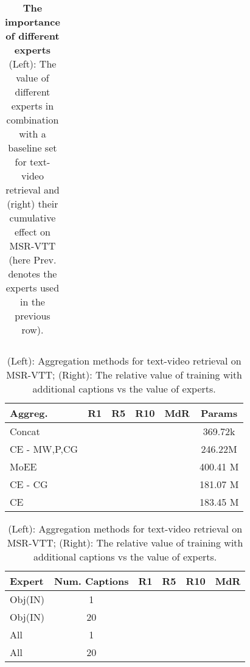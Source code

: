 \documentclass{bmvc2k}
\begin{document}
\begin{table}[h!]
\begin{minipage}{0.45\linewidth}
\begin{tabular}{l c c c c c}
\end{tabular}
\end{minipage}
\vspace{0.2cm}
\caption{\textbf{The importance of different experts} (Left): The value of different experts in combination with a baseline set for text-video retrieval and (right) their cumulative effect on MSR-VTT (here Prev. denotes the experts used in the previous row).}
\label{table:Ablation_single} 
\end{table}



\begin{table}[ht]
\hspace{-0.25cm}
\begin{minipage}{0.45\linewidth}
\centering 
\scriptsize 
\setlength{\tabcolsep}{2pt}
\begin{tabular}{l c c c c c } 
\hline\hline
Aggreg. &  R1 \hspace{0.5em} & R5 \hspace{0.5em} & R10\hspace{0.5em} & MdR\hspace{0.5em} & Params\hspace{0.5em}  \\ 
\hline 
Concat &	&	&	&	& 369.72k \\
CE - MW,P,CG &	&	&	& & 246.22M \\
MoEE~\cite{miech2018learning} &	&	&	& & 400.41 M \\
CE - CG &	&	&	& & 181.07 M \\
CE &	&	&	& & 183.45 M \\
\hline\hline
\end{tabular}
\end{minipage}
\hspace{0.6cm}
\begin{minipage}{0.45\linewidth}

\centering 
\scriptsize 
\setlength{\tabcolsep}{2pt}
\begin{tabular}{l c| c  c c c}
\hline \hline
Expert & Num. Captions & R1 & R5 & R10 & MdR   \\ 
\hline 
Obj(IN) & 1 &	&	&	&	\\
Obj(IN) & 20 &	&	&	&	\\
All & 1 &	&	&	& \\
All & 20 &	&	&	& \\
\hline \hline

\end{tabular}
\end{minipage}
\vspace{0.1cm}
\caption{(Left): Aggregation methods for text-video retrieval on MSR-VTT; (Right): The relative value of training with additional captions vs the value of experts.}
\label{table:agg-captions} 
\vspace{-3mm}
\end{table}
\end{document}
